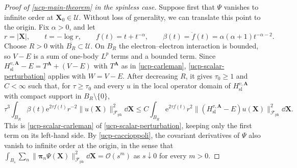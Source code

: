 \documentclass[final,reqno]{amsart}
\theoremstyle{remark}
\newcommand{\e}{\mathrm{e}}
\newcommand{\ol}[1]{\overline{#1}}
\newcommand{\ph}{\mathrm{ph}}
\newcommand{\Fock}{\mathcal{F}}
\newcommand{\vpi}{{\bm{\pi}}}
\newcommand{\vA}{{\mathbf{A}}}
\newcommand{\vX}{{\mathbf{X}}}
\begin{document}
\begin{proof}[Proof of \cref{ucp-main-theorem} in the spinless case]
Suppose first that $\Psi$ vanishes to infinite order at
$\vX_0\in\mathcal U$.  Without loss of generality, we can translate this
point to the origin.  Fix $\alpha>0$, and let
\[
 r=|\vX|,\qquad t=-\log r,\qquad
 f(t)=t+t^{-\alpha},\qquad
 \beta(t)=\ddot f(t)=\alpha(\alpha+1)t^{-\alpha-2}.
\]
Choose $R>0$ with $\ol{B_R}\subset\mathcal U$.  On $B_R$ the
electron--electron interaction is bounded, so $V-E$ is a sum of
one-body $L^p$ terms and a bounded term.  Since
$H_{\mathrm{sl}}^{v,\vA}-E=T^{\vA}+(V-E)$ with $T^{\vA}$ as in
\cref{ucp-carleman}, \cref{ucp-scalar-perturbation} applies with
$W=V-E$.  After decreasing $R$, it gives $\tau_0\geq1$ and $C<\infty$
such that, for $\tau\geq\tau_0$ and every $u$ in the local operator
domain of $H_{\mathrm{sl}}^{v,\vA}$ with compact support in
$B_R\setminus\{0\}$,
\begin{equation}\label{ucp-spinless-carleman}
 \tau^3\int_{B_R}\beta(t)\e^{2\tau f(t)}r^{-2}\|u(\vX)\|_{\Fock_\ph}^2\dd\vX
 \leq C\int_{B_R}\e^{2\tau f(t)}r^2
   \|(H_{\mathrm{sl}}^{v,\vA}-E)u(\vX)\|_{\Fock_\ph}^2\dd\vX.
\end{equation}
This is \cref{ucp-scalar-carleman} of \cref{ucp-scalar-perturbation}, keeping only
the first term on its left-hand side.  By \cref{ucp-caccioppoli}, the covariant derivatives of
$\Psi$ also vanish to infinite order at the origin, in the sense that
$\int_{B_s}\sum_n\|\vpi_n\Psi(\vX)\|_{\Fock_\ph}^2\dd\vX=\mathcal O(s^m)$ as
$s\downarrow0$ for every $m>0$.


\end{proof}
\end{document}
